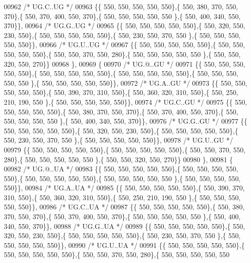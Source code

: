 \begin{DoxyCode}
00962 \textcolor{comment}{/* UG.C..UG */}
00963 \{\{ 550, 550, 550, 550, 550\},\{ 550, 380, 370, 550, 370\},\{ 550, 370, 400, 550, 370\},\{ 550, 550, 550, 550, 550
      \},\{ 550, 400, 340, 550, 370\}\},
00964 \textcolor{comment}{/* UG.G..UG */}
00965 \{\{ 550, 550, 550, 550, 550\},\{ 550, 320, 550, 230, 550\},\{ 550, 550, 550, 550, 550\},\{ 550, 230, 550, 370, 550
      \},\{ 550, 550, 550, 550, 550\}\},
00966 \textcolor{comment}{/* UG.U..UG */}
00967 \{\{ 550, 550, 550, 550, 550\},\{ 550, 550, 550, 550, 550\},\{ 550, 550, 370, 550, 280\},\{ 550, 550, 550, 550, 550
      \},\{ 550, 550, 320, 550, 270\}\}
00968 \},
00969 \{
00970 \textcolor{comment}{/* UG.@..GU */}
00971 \{\{ 550, 550, 550, 550, 550\},\{ 550, 550, 550, 550, 550\},\{ 550, 550, 550, 550, 550\},\{ 550, 550, 550, 550, 550
      \},\{ 550, 550, 550, 550, 550\}\},
00972 \textcolor{comment}{/* UG.A..GU */}
00973 \{\{ 550, 550, 550, 550, 550\},\{ 550, 390, 370, 310, 550\},\{ 550, 360, 320, 310, 550\},\{ 550, 250, 210, 190, 550
      \},\{ 550, 550, 550, 550, 550\}\},
00974 \textcolor{comment}{/* UG.C..GU */}
00975 \{\{ 550, 550, 550, 550, 550\},\{ 550, 380, 370, 550, 370\},\{ 550, 370, 400, 550, 370\},\{ 550, 550, 550, 550, 550
      \},\{ 550, 400, 340, 550, 370\}\},
00976 \textcolor{comment}{/* UG.G..GU */}
00977 \{\{ 550, 550, 550, 550, 550\},\{ 550, 320, 550, 230, 550\},\{ 550, 550, 550, 550, 550\},\{ 550, 230, 550, 370, 550
      \},\{ 550, 550, 550, 550, 550\}\},
00978 \textcolor{comment}{/* UG.U..GU */}
00979 \{\{ 550, 550, 550, 550, 550\},\{ 550, 550, 550, 550, 550\},\{ 550, 550, 370, 550, 280\},\{ 550, 550, 550, 550, 550
      \},\{ 550, 550, 320, 550, 270\}\}
00980 \},
00981 \{
00982 \textcolor{comment}{/* UG.@..UA */}
00983 \{\{ 550, 550, 550, 550, 550\},\{ 550, 550, 550, 550, 550\},\{ 550, 550, 550, 550, 550\},\{ 550, 550, 550, 550, 550
      \},\{ 550, 550, 550, 550, 550\}\},
00984 \textcolor{comment}{/* UG.A..UA */}
00985 \{\{ 550, 550, 550, 550, 550\},\{ 550, 390, 370, 310, 550\},\{ 550, 360, 320, 310, 550\},\{ 550, 250, 210, 190, 550
      \},\{ 550, 550, 550, 550, 550\}\},
00986 \textcolor{comment}{/* UG.C..UA */}
00987 \{\{ 550, 550, 550, 550, 550\},\{ 550, 380, 370, 550, 370\},\{ 550, 370, 400, 550, 370\},\{ 550, 550, 550, 550, 550
      \},\{ 550, 400, 340, 550, 370\}\},
00988 \textcolor{comment}{/* UG.G..UA */}
00989 \{\{ 550, 550, 550, 550, 550\},\{ 550, 320, 550, 230, 550\},\{ 550, 550, 550, 550, 550\},\{ 550, 230, 550, 370, 550
      \},\{ 550, 550, 550, 550, 550\}\},
00990 \textcolor{comment}{/* UG.U..UA */}
00991 \{\{ 550, 550, 550, 550, 550\},\{ 550, 550, 550, 550, 550\},\{ 550, 550, 370, 550, 280\},\{ 550, 550, 550, 550, 550

\end{DoxyCode}
